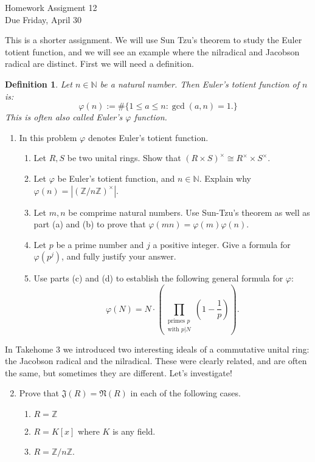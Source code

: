 \documentclass[11pt]{article}
\newtheorem{definition}[theorem]{Definition}
\newcommand{\bN}{\mathbb{N}}
\newcommand{\bZ}{\mathbb{Z}}
\newcommand{\fJ}{\mathfrak{J}}
\newcommand{\fN}{\mathfrak{N}}
\begin{document}
\begin{center}
  \Large {Homework Assigment 12}\\
  \small {Due Friday, April 30}
\end{center}
This is a shorter assignment.  We will use Sun Tzu's theorem to study the Euler totient function, and we will see an example where the nilradical and Jacobson radical are distinct.  First we will need a definition.
\begin{definition}
  Let $n\in\bN$ be a natural number.  Then \textit{Euler's totient function} of $n$ is:
  \[\varphi(n):=\#\{1\le a\le n : \gcd(a,n)=1.\}\]
  This is often also called \textit{Euler's $\varphi$ function}.
\end{definition}
\begin{enumerate}
  \item{
  In this problem $\varphi$ denotes Euler's totient function.
  \begin{enumerate}
    \item{
    Let $R,S$ be two unital rings.  Show that $(R\times S)^\times\cong R^\times\times S^\times$.
    }
    \item{
    Let $\varphi$ be Euler's totient function, and $n\in\bN$.  Explain why $\varphi(n) = |(\bZ/n\bZ)^\times|$.
    }
    \item{
    Let $m,n$ be comprime natural numbers.  Use Sun-Tzu's theorem as well as part (a) and (b) to prove that $\varphi(mn) = \varphi(m)\varphi(n)$.
    }
    \item{
    Let $p$ be a prime number and $j$ a positive integer.  Give a formula for $\varphi(p^j)$, and fully justify your answer.
    }
    \item{
    Use parts (c) and (d) to establish the following general formula for $\varphi$:
    \[\varphi(N) = N\cdot\left(\prod_{\substack{\text{primes }p\\ \text{with }p|N}}\left(1-\frac{1}{p}\right)\right).\]
    }
  \end{enumerate}
  }
\end{enumerate}
In Takehome 3 we introduced two interesting ideals of a commutative unital ring: the Jacobson radical and the nilradical.  These were clearly related, and are often the same, but sometimes they are different.  Let's investigate!
\begin{enumerate}
  \setcounter{enumi}{1}
  \item{
  Prove that $\fJ(R) = \fN(R)$ in each of the following cases.
  \begin{enumerate}
    \item{$R = \bZ$}
    \item{$R = K[x]$ where $K$ is any field.}
    \item{$R = \bZ/n\bZ$.}
  \end{enumerate}
  }
\end{enumerate}
\end{document}
